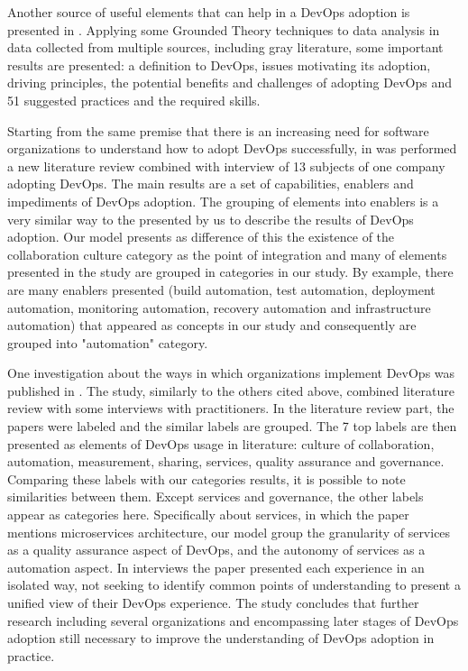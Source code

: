 Another source of useful elements that can help in a DevOps adoption is presented in \cite{characterizing_devops_sbes_2016}. Applying some Grounded Theory techniques to data analysis in data collected from multiple sources, including gray literature, some important results are presented: a definition to DevOps, issues motivating its adoption, driving principles, the potential benefits and challenges of adopting DevOps and 51 suggested practices and the required skills.

Starting from the same premise that there is an increasing need for software organizations to understand how to adopt DevOps successfully, in \cite{devops_a_definition_xp_15} was performed a new literature review combined with interview of 13 subjects of one company adopting DevOps. The main results are a set of capabilities, enablers and impediments of DevOps adoption. The
grouping of elements into enablers is a very similar way to the presented by us to describe the results of DevOps adoption. Our model presents as difference of this the existence of the collaboration culture category as the point of integration and many of elements presented in the study are grouped in categories in our study. By example, there are many enablers presented (build automation, test automation, deployment automation, monitoring automation, recovery automation and infrastructure automation) that appeared as concepts in our study and consequently are grouped into "automation" category.

One investigation about the ways in which organizations implement DevOps was published in \cite{qualitative_devops_journalsw_17}. The study, similarly to the others cited above, combined literature review with some interviews with practitioners. In the literature review part, the papers were labeled and the similar labels are grouped. The 7 top labels are then presented as elements of DevOps usage in literature: culture of collaboration, automation, measurement, sharing, services, quality assurance and governance. Comparing these labels with our categories results, it is possible to note similarities between them. Except services and governance, the other labels appear as categories here. Specifically about services, in which the paper mentions microservices architecture, our model group the granularity of services as a quality assurance aspect of DevOps, and the autonomy of services as a automation aspect. In interviews the paper presented each experience in an isolated way, not seeking to identify common points of understanding to present a unified view of their DevOps experience. The study concludes that further research including several organizations and encompassing later stages of DevOps adoption still necessary to improve the understanding of DevOps adoption in practice.

